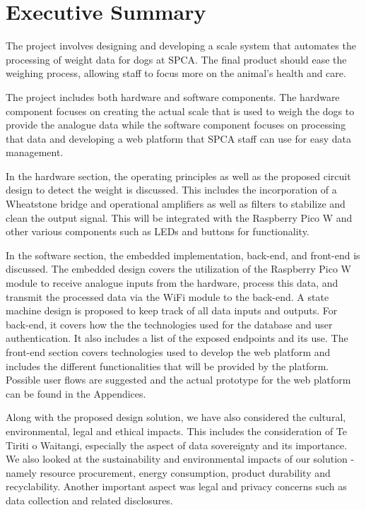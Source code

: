 
\chapter{Executive Summary}

The project involves designing and developing a scale system that automates the processing of weight data for dogs at SPCA. The final product should ease the weighing process, allowing staff to focus more on the animal's health and care.

The project includes both hardware and software components. The hardware component focuses on creating the actual scale that is used to weigh the dogs to provide the analogue data while the software component focuses on processing that data and developing a web platform that SPCA staff can use for easy data management.

In the hardware section, the operating principles as well as the proposed circuit design to detect the weight is discussed. This includes the incorporation of a Wheatstone bridge and operational amplifiers as well as filters to stabilize and clean the output signal. This will be integrated with the Raspberry Pico W and other various components such as LEDs and buttons for functionality. 

In the software section, the embedded implementation, back-end, and front-end is discussed. The embedded design covers the utilization of the Raspberry Pico W module to receive analogue inputs from the hardware, process this data, and transmit the processed data via the WiFi module to the back-end. A state machine design is proposed to keep track of all data inputs and outputs. For back-end, it covers how the the technologies used for the database and user authentication. It also includes a list of the exposed endpoints and its use. The front-end section covers technologies used to develop the web platform and includes the different functionalities that will be provided by the platform. Possible user flows are suggested and the actual prototype for the web platform can be found in the Appendices.

Along with the proposed design solution, we have also considered the cultural, environmental, legal and ethical impacts. This includes the consideration of Te Tiriti o Waitangi, especially the aspect of data sovereignty and its importance. We also looked at the sustainability and environmental impacts of our solution - namely resource procurement, energy consumption, product durability and recyclability. Another important aspect was legal and privacy concerns such as data collection and related disclosures.